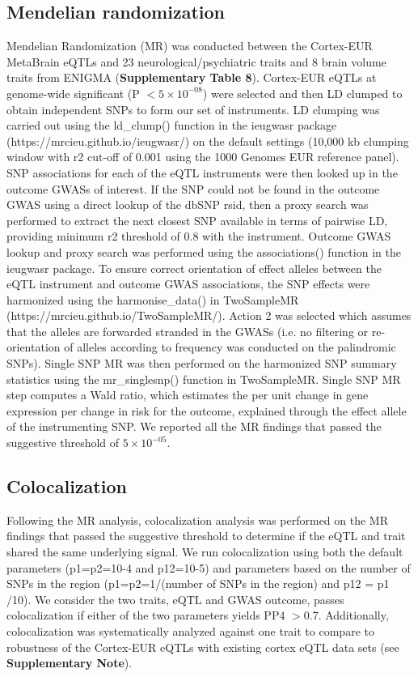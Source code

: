 \subsection{Mendelian randomization}
Mendelian Randomization (MR) was conducted between the Cortex-EUR MetaBrain eQTLs and 23 neurological/psychiatric traits and 8 brain volume traits from ENIGMA (\textbf{Supplementary Table 8}). Cortex-EUR eQTLs at genome-wide significant (P $< 5 \times 10^{-08}$) were selected and then LD clumped to obtain independent SNPs to form our set of instruments. LD clumping was carried out using the ld\_clump() function in the ieugwasr package (https://mrcieu.github.io/ieugwasr/) on the default settings (10,000 kb clumping window with r2 cut-off of 0.001 using the 1000 Genomes EUR reference panel). SNP associations for each of the eQTL instruments were then looked up in the outcome GWASs of interest. If the SNP could not be found in the outcome GWAS using a direct lookup of the dbSNP rsid, then a proxy search was performed to extract the next closest SNP available in terms of pairwise LD, providing minimum r2 threshold of 0.8 with the instrument. Outcome GWAS lookup and proxy search was performed using the associations() function in the ieugwasr package. To ensure correct orientation of effect alleles between the eQTL instrument and outcome GWAS associations, the SNP effects were harmonized using the harmonise\_data() in TwoSampleMR (https://mrcieu.github.io/TwoSampleMR/). Action 2 was selected which assumes that the alleles are forwarded stranded in the GWASs (i.e. no filtering or re-orientation of alleles according to frequency was conducted on the palindromic SNPs). Single SNP MR was then performed on the harmonized SNP summary statistics using the mr\_singlesnp() function in TwoSampleMR. Single SNP MR step computes a Wald ratio, which estimates the per unit change in gene expression per change in risk for the outcome, explained through the effect allele of the instrumenting SNP. We reported all the MR findings that passed the suggestive threshold of $5 \times 10^{-05}$. 

\subsection{Colocalization}
Following the MR analysis, colocalization analysis was performed on the MR findings that passed the suggestive threshold to determine if the eQTL and trait shared the same underlying signal. We run colocalization using both the default parameters (p1=p2=10-4 and p12=10-5) and parameters based on the number of SNPs in the region (p1=p2=1/(number of SNPs in the region) and p12 = p1 /10). We consider the two traits, eQTL and GWAS outcome, passes colocalization if either of the two parameters yields PP4 $>$0.7. Additionally, colocalization was systematically analyzed against one trait to compare to robustness of the Cortex-EUR eQTLs with existing cortex eQTL data sets (see \textbf{Supplementary Note}). 


